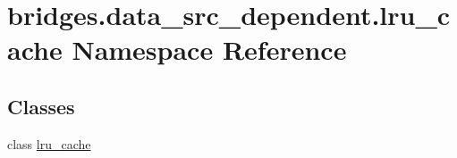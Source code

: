 \hypertarget{namespacebridges_1_1data__src__dependent_1_1lru__cache}{}\section{bridges.\+data\+\_\+src\+\_\+dependent.\+lru\+\_\+cache Namespace Reference}
\label{namespacebridges_1_1data__src__dependent_1_1lru__cache}
\subsection*{Classes}
\begin{DoxyCompactItemize}
\item 
class \mbox{\hyperlink{classbridges_1_1data__src__dependent_1_1lru__cache_1_1lru__cache}{lru\+\_\+cache}}
\end{DoxyCompactItemize}

